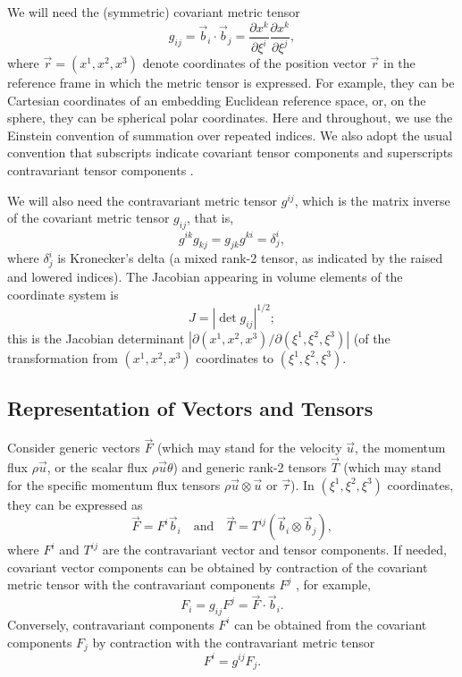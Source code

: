 \documentclass{report}
\begin{document}
We will need the (symmetric) covariant metric tensor
\begin{equation}
    g_{ij} = \vec{b}_i \cdot \vec{b}_j = \frac{\partial x^k}{\partial\xi^i} \frac{\partial x^k}{\partial \xi^j},
\end{equation} 
where $\vec{r} = (x^1, x^2, x^3)$ denote coordinates of the position vector $\vec{r}$ in the reference frame in which the metric tensor is expressed. For example, they can be Cartesian coordinates of an embedding Euclidean reference space, or, on the sphere, they can be spherical polar coordinates. Here and throughout, we use the Einstein convention of summation over repeated indices. We also  adopt the usual convention that subscripts indicate covariant tensor components and superscripts contravariant tensor components \citep[e.g.,][]{Arfken13}. 

We will also need the contravariant metric tensor $g^{ij}$, which is the matrix inverse of the covariant metric tensor $g_{ij}$, that is, 
\[
g^{ik} g_{kj} = g_{jk} g^{ki} = \delta^i_j,
\]
where $\delta^i_j$ is Kronecker's delta (a mixed rank-2 tensor, as indicated by the raised and lowered indices). The Jacobian appearing in volume elements of the coordinate system is
\begin{equation}
    J = |\det g_{ij}|^{1/2};
\end{equation}
this is the Jacobian determinant $|\partial (x^1, x^2, x^3)/\partial (\xi^1, \xi^2, \xi^3)|$ (of the transformation from $(x^1, x^2, x^3)$ coordinates to $(\xi^1, \xi^2, \xi^3)$.

\subsection{Representation of Vectors and Tensors}

Consider generic vectors $\vec{F}$ (which may stand for the velocity $\vec{u}$, the momentum flux $\rho \vec{u}$, or the scalar flux $\rho \vec{u} \theta$) and generic rank-2 tensors $\vec{T}$ (which may stand for the specific momentum flux tensors $\rho \vec{u} \otimes \vec{u}$ or $\vec{\tau}$). In $(\xi^1, \xi^2, \xi^3)$ coordinates, they can be expressed as 
\begin{equation}\label{e:contravariant_vectors}
\vec{F} = F^i \vec{b}_i \quad \text{and} \quad \vec{T} = T^{ij} (\vec{b}_i \otimes \vec{b}_j), 
\end{equation}
where $F^i$ and $T^{ij}$ are the contravariant vector and tensor components. If needed, covariant vector components can be obtained by contraction of the covariant metric tensor with the contravariant components $F^j$ , for example,
\begin{equation}\label{e:covariant_components}
 F_i  = g_{ij} F^j = \vec{F} \cdot \vec{b}_i.
\end{equation}
Conversely, contravariant components $F^i$ can be obtained from the covariant components $F_j$ by contraction with the contravariant metric tensor
\begin{equation}
 F^i  = g^{ij} F_j.
\end{equation}
\end{document}
